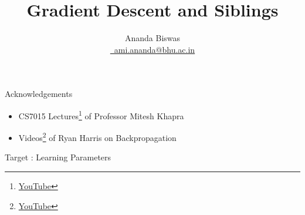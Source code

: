 \documentclass[10pt, aspectratio=169]{beamer}
\title{Gradient Descent and Siblings}
\author[\href{mailto:ami.ananda@bhu.ac.in}{\faEnvelope \, ami.ananda@bhu.ac.in}]{Ananda Biswas \\[0.5em] \href{mailto:ami.ananda@bhu.ac.in}{\faEnvelope \, ami.ananda@bhu.ac.in}}
\date{}
\begin{document}
\begin{frame}
	\titlepage
\end{frame}

\begin{frame}
	\begin{block}{Acknowledgements}
		\begin{itemize}
		\item CS7015 Lectures\footnote{\href{https://www.youtube.com/playlist?list=PLyqSpQzTE6M9gCgajvQbc68Hk_JKGBAYT}{YouTube}} of Professor Mitesh Khapra \\[0.75em]
		\item Videos\footnote{\href{https://www.youtube.com/playlist?list=PLEAYkSg4uSQ2WG11drrwV6Igj360RaxK9}{YouTube}} of Ryan Harris on Backpropagation
		\end{itemize}			
	\end{block}
\end{frame}


\begin{frame}{Target : Learning Parameters}
\centering
{}
\end{frame}
\end{document}

